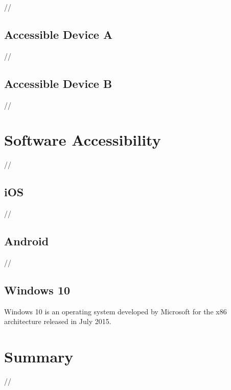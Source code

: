 //


\subsection{Accessible Device A}


//


\subsection{Accessible Device B}


//


\section{Software Accessibility}

//


\subsection{iOS}

//


\subsection{Android}

//


\subsection{Windows 10}

Windows 10 is an operating system developed by Microsoft for the x86 architecture released in July 2015.


\section{Summary}

//